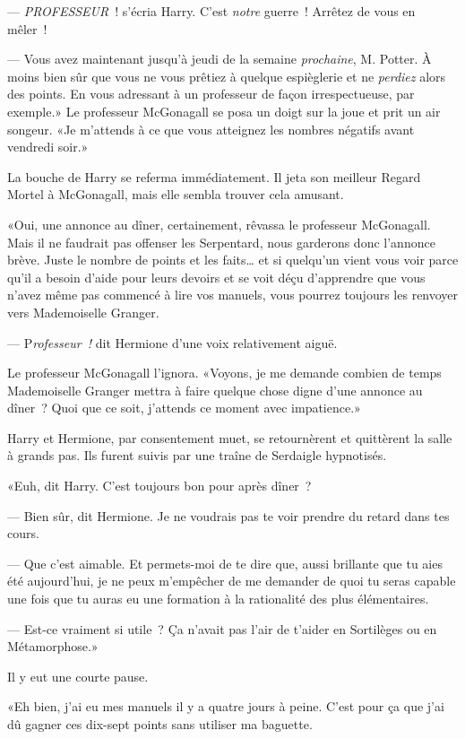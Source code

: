--- \emph{PROFESSEUR}~! s'écria Harry. C'est \emph{notre} guerre~! Arrêtez de vous en mêler~!

--- Vous avez maintenant jusqu'à jeudi de la semaine \emph{prochaine}, M. Potter. À moins bien sûr que vous ne vous prêtiez à quelque espièglerie et ne \emph{perdiez} alors des points. En vous adressant à un professeur de façon irrespectueuse, par exemple.» Le professeur McGonagall se posa un doigt sur la joue et prit un air songeur. «Je m'attends à ce que vous atteignez les nombres négatifs avant vendredi soir.»

La bouche de Harry se referma immédiatement. Il jeta son meilleur Regard Mortel à McGonagall, mais elle sembla trouver cela amusant.

«Oui, une annonce au dîner, certainement, rêvassa le professeur McGonagall. Mais il ne faudrait pas offenser les Serpentard, nous garderons donc l'annonce brève. Juste le nombre de points et les faits… et si quelqu'un vient vous voir parce qu'il a besoin d'aide pour leurs devoirs et se voit déçu d'apprendre que vous n'avez même pas commencé à lire vos manuels, vous pourrez toujours les renvoyer vers Mademoiselle Granger.

--- P\emph{rofesseur~!} dit Hermione d'une voix relativement aiguë.

Le professeur McGonagall l'ignora. «Voyons, je me demande combien de temps Mademoiselle Granger mettra à faire quelque chose digne d'une annonce au dîner~? Quoi que ce soit, j'attends ce moment avec impatience.»

Harry et Hermione, par consentement muet, se retournèrent et quittèrent la salle à grands pas. Ils furent suivis par une traîne de Serdaigle hypnotisés.

«Euh, dit Harry. C'est toujours bon pour après dîner~?

--- Bien sûr, dit Hermione. Je ne voudrais pas te voir prendre du retard dans tes cours.

--- Que c'est aimable. Et permets-moi de te dire que, aussi brillante que tu aies été aujourd'hui, je ne peux m'empêcher de me demander de quoi tu seras capable une fois que tu auras eu une formation à la rationalité des plus élémentaires.

--- Est-ce vraiment si utile~? Ça n'avait pas l'air de t'aider en Sortilèges ou en Métamorphose.»

Il y eut une courte pause.

«Eh bien, j'ai eu mes manuels il y a quatre jours à peine. C'est pour ça que j'ai dû gagner ces dix-sept points sans utiliser ma baguette.


